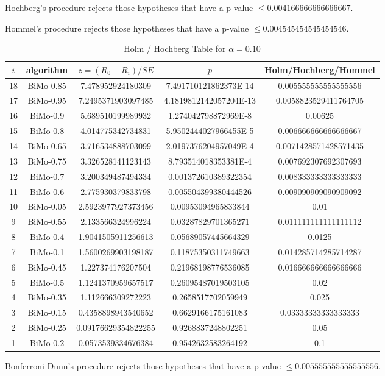 \documentclass[a4paper,10pt]{article}
\begin{document}
\begin{landscape}
Hochberg's procedure rejects those hypotheses that have a p-value $\le0.004166666666666667$.


Hommel's procedure rejects those hypotheses that have a p-value $\le0.004545454545454546$.


\begin{table}[!htp]
\centering\tiny
\caption{Holm / Hochberg Table for $\alpha=0.10$}
\begin{tabular}{ccccc}
$i$&algorithm&$z=(R_0 - R_i)/SE$&$p$&Holm/Hochberg/Hommel\\
\hline
18&BiMo-0.85&7.478952924180309&7.491710121862373E-14&0.005555555555555556\\
17&BiMo-0.95&7.2495371903097485&4.1819812142057204E-13&0.0058823529411764705\\
16&BiMo-0.9&5.689510199989932&1.274042798872969E-8&0.00625\\
15&BiMo-0.8&4.014775342734831&5.9502444027966455E-5&0.006666666666666667\\
14&BiMo-0.65&3.716534888703099&2.0197376204957049E-4&0.0071428571428571435\\
13&BiMo-0.75&3.326528141123143&8.793514018353381E-4&0.007692307692307693\\
12&BiMo-0.7&3.200349487494334&0.001372610389322354&0.008333333333333333\\
11&BiMo-0.6&2.775930379833798&0.005504399380444526&0.009090909090909092\\
10&BiMo-0.05&2.5923977927373456&0.00953094965833844&0.01\\
9&BiMo-0.55&2.133566324996224&0.03287829701365271&0.011111111111111112\\
8&BiMo-0.4&1.9041505911256613&0.05689057445664329&0.0125\\
7&BiMo-0.1&1.5600269903198187&0.11875350311749663&0.014285714285714287\\
6&BiMo-0.45&1.227374176207504&0.21968198776536085&0.016666666666666666\\
5&BiMo-0.5&1.1241370959657517&0.26095487019503105&0.02\\
4&BiMo-0.35&1.112666309272223&0.2658517702059949&0.025\\
3&BiMo-0.15&0.4358898943540652&0.6629166175161083&0.03333333333333333\\
2&BiMo-0.25&0.09176629354822255&0.9268837248802251&0.05\\
1&BiMo-0.2&0.0573539334676384&0.9542632583264192&0.1\\
\hline
\end{tabular}
\end{table}
Bonferroni-Dunn's procedure rejects those hypotheses that have a p-value $\le0.005555555555555556$.



\end{landscape}
\end{document}
